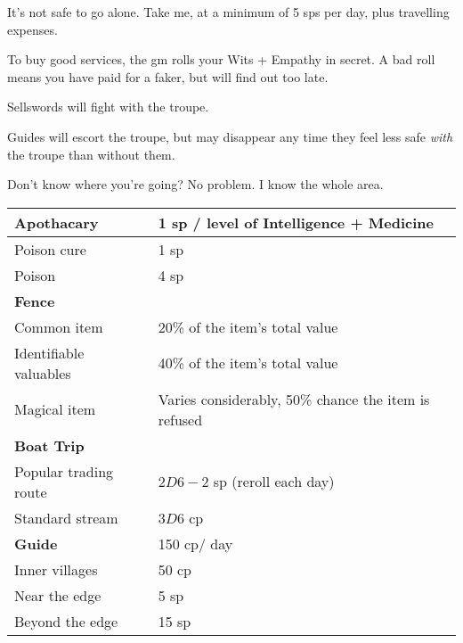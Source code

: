 \begin{multicols}{2}

\begin{boxtext}
  It's not safe to go alone.
  Take me, at a minimum of 5 \glspl{sp} per day, plus travelling expenses.
\end{boxtext}

To buy good services, the \gls{gm} rolls your Wits + Empathy in secret.
A bad roll means you have paid for a faker, but will find out too late.

Sellswords will fight with the troupe.

Guides will escort the troupe, but may disappear any time they feel less safe \emph{with} the troupe than without them.

\begin{boxtext}
  Don't know where you're going?
  No problem.
  I know the whole area.
\end{boxtext}

\noindent
\begin{tabularx}{\linewidth}{XX}

\textbf{Apothacary} & 1 \gls{sp} / level of Intelligence + Medicine \\\hline

Poison cure & 1 \gls{sp} \\

Poison & 4 \gls{sp} \\\hline

\textbf{Fence} & \\\hline

Common item & 20\% of the item's total value \\

Identifiable valuables & 40\% of the item's total value \\

Magical item & Varies considerably, 50\% chance the item is refused \\\hline

\textbf{Boat Trip} & \\\hline

Popular trading route & $2D6-2$ \gls{sp} (reroll each day) \\

Standard stream & $3D6$ \gls{cp} \\\hline

\textbf{Guide} &  150 \gls{cp}/ day \\\hline

  Inner villages & 50 \gls{cp} \\
  Near the \gls{edge} & 5 \gls{sp} \\
  Beyond the \gls{edge} & 15 \gls{sp} \\


\end{tabularx}
\end{multicols}
